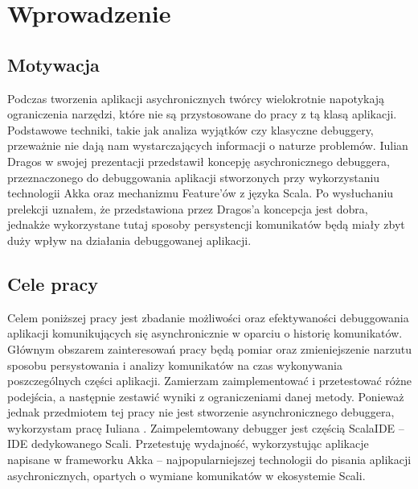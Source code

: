 \chapter{Wprowadzenie}


\section{Motywacja}

Podczas tworzenia aplikacji asychronicznych twórcy wielokrotnie napotykają ograniczenia narzędzi, które nie są przystosowane do pracy z tą klasą aplikacji. Podstawowe techniki, takie jak analiza wyjątków czy klasyczne debuggery, przeważnie nie dają nam wystarczających informacji o naturze problemów. Iulian Dragos w swojej prezentacji \cite{rethingningDebugger} przedstawił koncepję asychronicznego debuggera, przeznaczonego do debuggowania aplikacji stworzonych przy wykorzystaniu technologii Akka oraz mechanizmu Feature'ów z języka Scala. Po wysłuchaniu prelekcji uznałem, że przedstawiona przez Dragos'a koncepcja jest dobra, jednakże wykorzystane tutaj sposoby persystencji komunikatów będą miały zbyt duży wpływ na działania debuggowanej aplikacji.



\section{Cele pracy}


Celem poniższej pracy jest zbadanie możliwości oraz efektywaności debuggowania aplikacji komunikujących się asynchronicznie w oparciu o historię komunikatów. Głównym obszarem zainteresowań pracy będą pomiar oraz zmieniejszenie narzutu sposobu persystowania i analizy komunikatów na czas wykonywania poszczególnych części aplikacji. Zamierzam zaimplementować i przetestować różne podejścia, a następnie zestawić wyniki z ograniczeniami danej metody. Ponieważ jednak przedmiotem tej pracy nie jest stworzenie asynchronicznego debuggera, wykorzystam pracę Iuliana \cite{asychDebuggerGh}. Zaimpelemtowany debugger jest częścią ScalaIDE – IDE dedykowanego Scali. Przetestuję wydajność, wykorzystując aplikacje napisane w frameworku Akka – najpopularniejszej technologii do pisania aplikacji asychronicznych, opartych o wymiane komunikatów w ekosystemie Scali.













